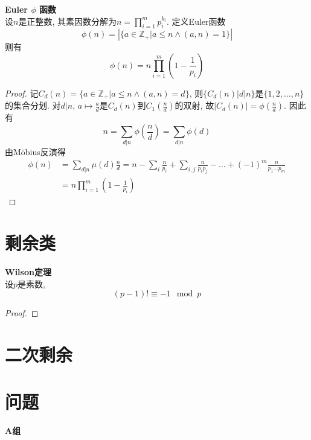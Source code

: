 \begin{pro} \textbf{Euler $\phi$ 函数}\\
设$n$是正整数, 其素因数分解为$n=\prod_{i=1}^m p_i^{k_i}$. 定义Euler函数
\begin{equation}
    \phi(n)=| \{a\in \mathbb{Z}_+\vert a\le n \land (a,n)=1\}|
\end{equation}
则有
\begin{equation}
    \phi(n)=n\prod_{i=1}^m \left(1-\frac{1}{p_i} \right)
\end{equation}
\label{pro:euler_phi}
\end{pro}
\begin{proof}
记$C_d(n)=\{a\in \mathbb{Z}_+\vert a\le n \land (a,n)=d\}$, 则$\{C_d(n)\vert d|n\}$是$\{1,2,\dots,n\}$的集合分划. 对$d|n$, $a\mapsto \frac{a}{d}$是$C_d(n)$到$C_1(\frac{n}{d})$的双射, 故$|C_d(n)|=\phi(\frac{n}{d})$. 因此有
\begin{equation}
    n = \sum_{d|n} \phi\left(\frac{n}{d}\right) = \sum_{d|n} \phi(d)
\end{equation}
由Möbius反演得
\begin{align*}
    \phi(n) &= \sum_{d|n} \mu(d) \frac{n}{d} = n - \sum_{i}  \frac{n}{p_i} +  \sum_{i,j}  \frac{n}{p_ip_j} - \dots + (-1)^m \frac{n}{p_1\dots p_m}\\
    &=n\prod_{i=1}^m \left(1-\frac{1}{p_i} \right)
\end{align*}
\end{proof}

\section{剩余类}

\begin{thm} \textbf{Wilson定理}\\
设$p$是素数, 
\begin{equation}
    (p-1)!\equiv -1 \mod p
\end{equation}
\end{thm}
\begin{proof}

\end{proof}


\section{二次剩余}

\section*{问题}
\par \textbf{A组}

